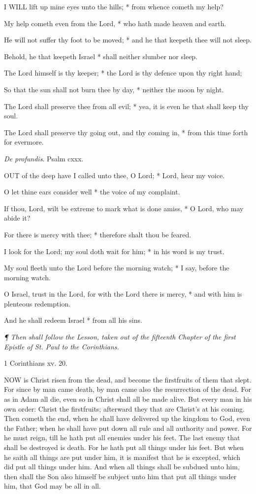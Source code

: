 I WILL lift up mine eyes
unto the hills; * from whence cometh my help?

My help cometh even from the Lord, * who hath made
heaven and earth.

He will not suffer thy foot to be moved; * and he that
keepeth thee will not sleep.

Behold, he that keepeth Israel * shall neither slumber
nor sleep.

The Lord himself is thy keeper; * the Lord is thy defence
upon thy right hand;

So that the sun shall not burn thee by day, * neither
the moon by night.

The Lord shall preserve thee from all evil; * yea,
it is even he that shall keep thy soul.

The Lord shall preserve thy going out, and thy coming
in, * from this time forth for evermore.

\emph{De profundis}. Psalm cxxx.

OUT of the deep have I
called unto thee, O Lord; * Lord, hear my voice.

O let thine ears consider well * the voice of my complaint.

If thou, Lord, wilt be extreme to mark what is done
amiss, * O Lord, who may abide it?

For there is mercy with thee; * therefore shalt thou
be feared.

I look for the Lord; my soul doth wait for him; * in
his word is my trust.

My soul fleeth unto the Lord before the morning watch;
* I say, before the morning watch.

O Israel, trust in the Lord, for with the Lord there
is mercy, * and with him is plenteous redemption.

And he shall redeem Israel * from all his sins. 

\emph{¶
Then shall follow the Lesson, taken out of the fifteenth Chapter of the
first Epistle of St. Paul to the Corinthians.}

1 Corinthians
xv. 20.

NOW
is Christ risen from the dead, and become the firstfruits of them that
slept. For since by man came death, by man came also the resurrection
of the dead. For as in Adam all die, even so in Christ shall all be made
alive. But every man in his own order: Christ the firstfruits; afterward
they that are Christ's at his coming. Then cometh the end, when he shall
have delivered up the kingdom to God, even the Father; when he shall have
put down all rule and all authority and power. For he must reign, till
he hath put all enemies under his feet. The last enemy that shall be destroyed
is death. For he hath put all things under his feet. But when he saith
all things are put under him, it is manifest that he is excepted, which
did put all things under him. And when all things shall be subdued unto
him, then shall the Son also himself be subject unto him that put all
things under him, that God may be all in all.


